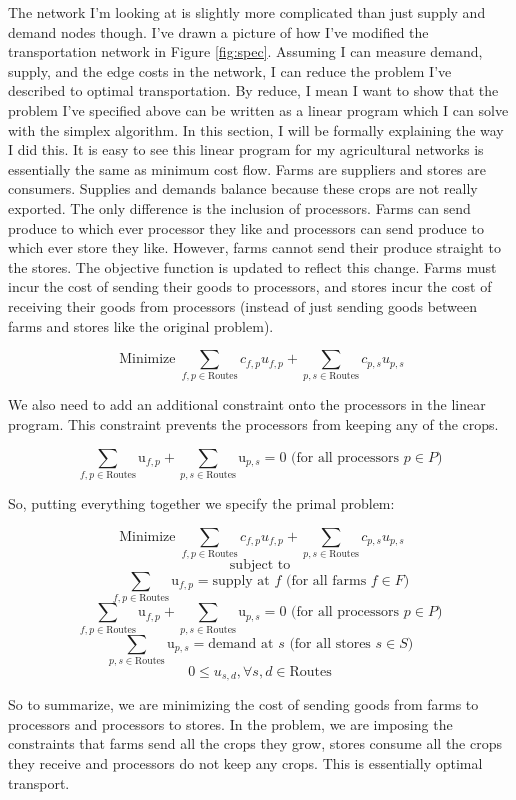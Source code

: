 \documentclass{report}
\begin{document}
The network I'm looking at is slightly more complicated than just supply and demand nodes though. I've drawn a picture of how I've modified the transportation network in Figure \ref{fig:spec}. Assuming I can measure demand, supply, and the edge costs in the network, I can reduce the problem I've described to optimal transportation. By reduce, I mean I want to show that the problem I've specified above can be  written as a linear program which I can solve with the simplex algorithm. In this section, I will be formally explaining the way I did this. It is easy to see this linear program for my agricultural networks is essentially the same as minimum cost flow. Farms are suppliers and stores are consumers. Supplies and demands balance because these crops are not really exported. The only difference is the inclusion of processors. Farms can send produce to which ever processor they like and processors can send produce to which ever store they like. However, farms cannot send their produce straight to the stores. The objective function is updated to reflect this change. Farms must incur the cost of sending their goods to processors, and stores incur the cost of receiving their goods from processors (instead of just sending goods between farms and stores like the original problem).

$$\operatorname{Minimize} \sum_{f,p \in \text{Routes}} c_{f,p} u_{f,p} + \sum_{p,s \in \text{Routes}} c_{p,s} u_{p,s}$$

We also need to add an additional constraint onto the processors in the linear program. This constraint prevents the processors from keeping any of the crops.

$$\sum_{f,p \in \text{Routes}} \text{u}_{f,p} + \sum_{p,s \in \text{Routes}} \text{u}_{p,s} = 0 \text{ (for all processors } p \in P)$$

So, putting everything together we specify the primal problem:

$$\operatorname{Minimize} \sum_{f,p \in \text{Routes}} c_{f,p} u_{f,p} + \sum_{p,s \in \text{Routes}} c_{p,s} u_{p,s}$$
$$\text{subject to}$$
$$\sum_{f,p \in \text{Routes}} \text{u}_{f,p}= \text{supply at } f \text{ (for all farms } f \in F)$$
$$\sum_{f,p \in \text{Routes}} \text{u}_{f,p} + \sum_{p,s \in \text{Routes}} \text{u}_{p,s} = 0 \text{ (for all processors } p \in P)$$
$$\sum_{p,s \in \text{Routes}} \text{u}_{p,s}= \text{demand at } s \text{ (for all stores } s \in S)$$
$$0 \leq u_{s,d}, \forall s,d \in \text{Routes}$$

So to summarize, we are minimizing the cost of sending goods from farms to processors and processors to stores. In the problem, we are imposing the constraints that farms send all the crops they grow, stores consume all the crops they receive and processors do not keep any crops. This is essentially optimal transport.
\end{document}
